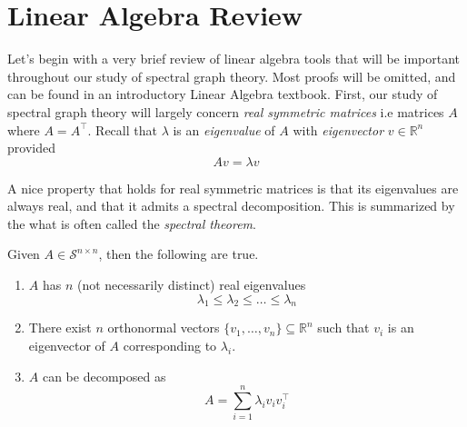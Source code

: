 
\section{Linear Algebra Review}

Let's begin with a very brief review of linear algebra tools that will be important throughout our study of spectral graph theory. Most proofs will be omitted, and can be found in an introductory Linear Algebra textbook. First, our study of spectral graph theory will largely concern \emph{real symmetric matrices} i.e matrices $A$ where $A = A^\top$. Recall that $\lambda$ is an \emph{eigenvalue} of $A$ with \emph{eigenvector} $v \in \mathbb{R}^n$ provided 
\begin{equation*}
Av = \lambda v
\end{equation*}

A nice property that holds for real symmetric matrices is that its eigenvalues are always real, and that it admits a spectral decomposition. This is summarized by the what is often called the \emph{spectral theorem}.

\begin{theorem}
Given $A \in \mathcal{S}^{n \times n}$, then the following are true.
\vspace{-1em}
\begin{enumerate}[1.]
  \item $A$ has $n$ (not necessarily distinct) real eigenvalues
  \begin{equation*}
    \lambda_1 \leq \lambda_2 \leq \ldots \leq \lambda_n
  \end{equation*}

  \item There exist $n$ orthonormal vectors $\{ v_1, \ldots, v_n \} \subseteq \mathbb{R}^n$ such that $v_i$ is an eigenvector of $A$ corresponding to $\lambda_i$.
  
  \item $A$ can be decomposed as 
  \begin{equation*}
    A = \sum_{i=1}^n \lambda_i v_i v_i^\top 
  \end{equation*}
\end{enumerate}
\end{theorem}

